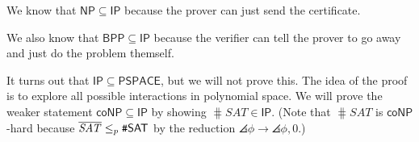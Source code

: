 \documentclass{scrartcl}
\begin{document}
We know that \(\mathsf{NP} \subseteq \mathsf{IP}\) because
the prover can just send the certificate.

We also know that \(\mathsf{BPP} \subseteq \mathsf{IP}\) because
the verifier can tell the prover to go away and just do the problem themself.

It turns out that \(\mathsf{IP} \subseteq \mathsf{PSPACE}\),
but we will not prove this. The idea of the proof is to
explore all possible interactions in polynomial space.
We will prove the weaker statement \(\mathsf{coNP} \subseteq \mathsf{IP}\)
by showing \(\hash\mathit{SAT} \in \mathsf{IP}\).
(Note that \(\hash\mathit{SAT}\) is \(\mathsf{coNP}\)-hard
  because \(\overline{\mathit{SAT}} \mathrel{\leq_p} \texttt\#\mathsf{SAT}\)
  by the reduction \(\angles{\phi} \to \angles{\phi, 0}\).)
\end{document}
